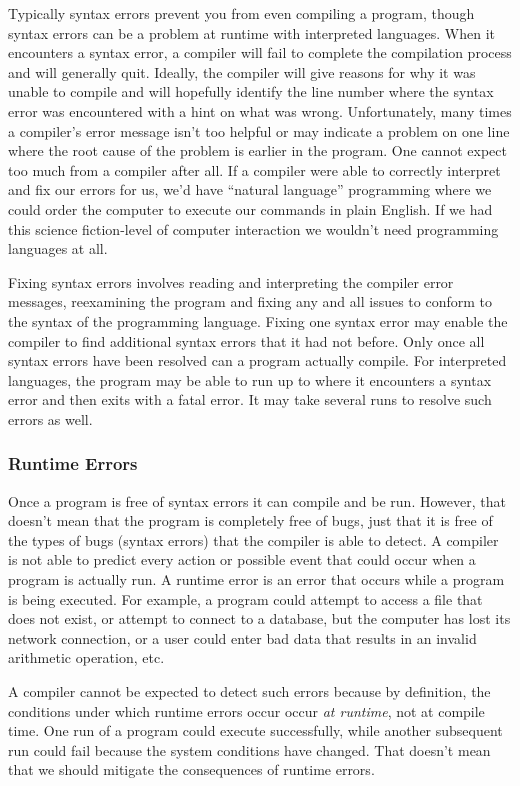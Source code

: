Typically syntax errors prevent you from even compiling a program, though syntax
errors can be a problem at runtime with interpreted languages.  When it encounters
a syntax error, a compiler will fail to complete the compilation process and will
generally quit.  Ideally, the compiler will give reasons for why it was unable to 
compile and will hopefully identify the line number where the syntax error was
encountered with a hint on what was wrong.  Unfortunately, many times a compiler's
error message isn't too helpful or may indicate a problem on one line where
the root cause of the problem is earlier in the program.  One cannot expect
too much from a compiler after all.  If a compiler were able to correctly
interpret and fix our errors for us, we'd have ``natural language'' programming
where we could order the computer to execute our commands in plain English.  
If we had this science fiction-level of computer interaction we wouldn't need 
programming languages at all.

Fixing syntax errors involves reading and interpreting the compiler error messages, 
reexamining the program and fixing any and all issues to conform to the syntax
of the programming language.  Fixing one syntax
error may enable the compiler to find additional syntax errors that it had not
before.  Only once all syntax errors have been resolved can a program actually
compile.  For interpreted languages, the program may be able to run up to
where it encounters a syntax error and then exits with a fatal error.  It may take
several runs to resolve such errors as well.

\subsubsection{Runtime Errors}

Once a program is free of syntax errors it can compile and be run.  However, that
doesn't mean that the program is completely free of bugs, just that it is free of
the types of bugs (syntax errors) that the compiler is able to detect.  A compiler
is not able to predict every action or possible event that could occur when a 
program is actually run.  A runtime error is an error that occurs while a program
is being executed.  For example, a program could attempt to access a file that
does not exist, or attempt to connect to a database, but the computer has lost
its network connection, or a user could enter bad data that results in an invalid
arithmetic operation, etc.

A compiler cannot be expected to detect such errors because by definition, the 
conditions under which runtime errors occur occur \emph{at runtime}, not at 
compile time.  One run of a program could execute successfully, while another
subsequent run could fail because the system conditions have changed.  That
doesn't mean that we should mitigate the consequences of runtime errors.

